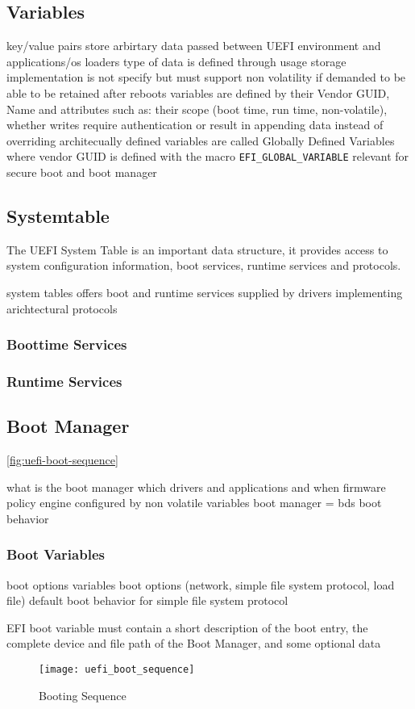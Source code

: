 \subsection{Variables}
key/value pairs
store arbirtary data passed between UEFI environment and applications/os loaders
type of data is defined through usage
storage implementation is not specify but must support non volatility if demanded to be able to be retained after reboots
variables are defined by their Vendor GUID, Name and attributes such as: their scope (boot time, run time, non-volatile), whether writes require authentication or result in appending data instead of overriding
\cite[8.2]{uefi-spec}
architecually defined variables are called Globally Defined Variables where vendor GUID is defined with the macro \lstinline{EFI_GLOBAL_VARIABLE}
\cite[3.3]{uefi-spec}
relevant for secure boot and boot manager

\subsection{Systemtable}
The UEFI System Table is an important data structure, it provides access to system configuration information, boot services, runtime services and protocols.

system tables offers boot and runtime services
supplied by drivers implementing arichtectural protocols %
\subsubsection{Boottime Services}
\subsubsection{Runtime Services}

\subsection{Boot Manager}

\autoref{fig:uefi-boot-sequence}

what is the boot manager
which drivers and applications and when
firmware policy engine
configured by non volatile variables
\cite[3.1.]{uefi-spec}
boot manager = bds
boot behavior
\subsubsection{Boot Variables}
boot options variables
boot options (network, simple file system protocol, load file)
default boot behavior for simple file system protocol

EFI boot variable must contain a short description of the boot entry, the complete
device and file path of the Boot Manager, and some optional data
\cite{windows-internals-7-part2}

\begin{figure}[htb]%
    \centering%
    \texttt{[image: uefi\_boot\_sequence]}%
    \caption{Booting Sequence \cite[Figure 2-1]{uefi-spec}}%
    \label{fig:uefi-boot-sequence}%
\end{figure}